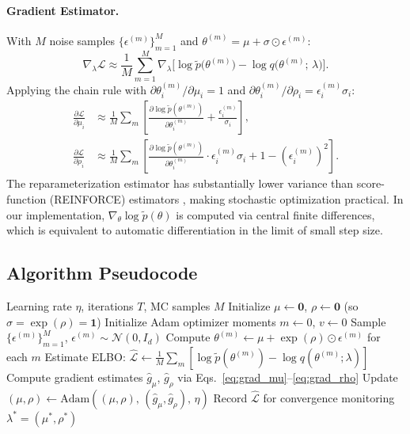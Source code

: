 \documentclass[12pt,a4paper]{article}
\newcommand{\N}{\mathcal{N}}
\newcommand{\pt}{\tilde{p}}
\newcommand{\ELBO}{\mathcal{L}}
\newcommand{\lam}{\lambda}
\newcommand{\sig}{\sigma}
\begin{document}
\paragraph{Gradient Estimator.}
With $M$ noise samples $\{\epsilon^{(m)}\}_{m=1}^M$ and
$\theta^{(m)} = \mu + \sig \odot \epsilon^{(m)}$:
\begin{equation}
  \nabla_\lam \ELBO \approx
  \frac{1}{M}\sum_{m=1}^{M}
  \nabla_\lam \!\bigl[
    \log\pt\!\bigl(\theta^{(m)}\bigr)
    - \log q\!\bigl(\theta^{(m)};\,\lam\bigr)
  \bigr].
  \label{eq:grad_estimator}
\end{equation}
Applying the chain rule with $\partial \theta^{(m)}_i / \partial \mu_i = 1$
and $\partial \theta^{(m)}_i / \partial \rho_i = \epsilon^{(m)}_i \sig_i$:
\begin{align}
  \frac{\partial \ELBO}{\partial \mu_i}
  &\approx \frac{1}{M}\sum_{m}\!
    \left[\frac{\partial \log\pt(\theta^{(m)})}{\partial \theta^{(m)}_i}
    + \frac{\epsilon^{(m)}_i}{\sig_i}\right],
  \label{eq:grad_mu} \\
  \frac{\partial \ELBO}{\partial \rho_i}
  &\approx \frac{1}{M}\sum_{m}\!
    \left[\frac{\partial \log\pt(\theta^{(m)})}{\partial \theta^{(m)}_i}
    \cdot \epsilon^{(m)}_i \sig_i
    + 1 - (\epsilon^{(m)}_i)^2\right].
  \label{eq:grad_rho}
\end{align}
The reparameterization estimator has substantially lower variance than
score-function (REINFORCE) estimators
\citep{rezende2014stochastic}, making stochastic optimization practical.
In our implementation, $\nabla_\theta \log\pt(\theta)$ is computed via
central finite differences, which is equivalent to automatic
differentiation in the limit of small step size.

\subsection{Algorithm Pseudocode}

\begin{algorithm}[H]
\caption{Mean-Field Stochastic Gradient VI (Reparameterization)}
\label{alg:vi}
\begin{algorithmic}[1]
\Require Learning rate $\eta$, iterations $T$, MC samples $M$
\State Initialize $\mu \gets \mathbf{0}$, $\rho \gets \mathbf{0}$
       (so $\sig = \exp(\rho) = \mathbf{1}$)
\State Initialize Adam optimizer moments $m \gets 0$, $v \gets 0$
  \State Sample $\{\epsilon^{(m)}\}_{m=1}^{M}$, \; $\epsilon^{(m)} \sim \N(0, I_d)$
  \State Compute $\theta^{(m)} \gets \mu + \exp(\rho) \odot \epsilon^{(m)}$ for each $m$
  \State Estimate ELBO: \;
         $\hat{\ELBO} \gets \frac{1}{M}\sum_m [\log\pt(\theta^{(m)}) - \log q(\theta^{(m)};\lam)]$
  \State Compute gradient estimates
         $\hat{g}_\mu$, $\hat{g}_\rho$ via Eqs.~\eqref{eq:grad_mu}--\eqref{eq:grad_rho}
  \State Update $(\mu, \rho) \gets \mathrm{Adam}\!\left((\mu,\rho),\,(\hat{g}_\mu,\hat{g}_\rho),\,\eta\right)$
  \State Record $\hat{\ELBO}$ for convergence monitoring
\EndFor
\State \Return $\lam^* = (\mu^*, \rho^*)$
\end{algorithmic}
\end{algorithm}
\end{document}
